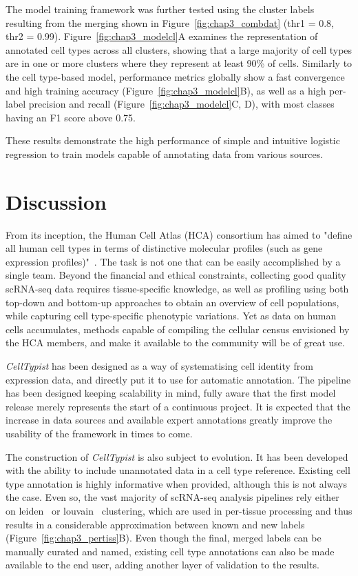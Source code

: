 The model training framework was further tested using the cluster labels resulting from the merging shown in Figure~\ref{fig:chap3_combdat} (thr1 = 0.8, thr2 = 0.99). Figure~\ref{fig:chap3_modelcl}A examines the representation of annotated cell types across all clusters, showing that a large majority of cell types are in one or more clusters where they represent at least 90\% of cells. Similarly to the cell type-based model, performance metrics globally show a fast convergence and high training accuracy (Figure~\ref{fig:chap3_modelcl}B), as well as a high per-label precision and recall (Figure~\ref{fig:chap3_modelcl}C, D), with most classes having an F1 score above 0.75.

These results demonstrate the high performance of simple and intuitive logistic regression to train models capable of annotating data from various sources.



\section{Discussion}
\label{section3.5}
From its inception, the Human Cell Atlas (HCA) consortium has aimed to "define all human cell types in terms of distinctive molecular profiles (such as gene expression profiles)"~\citep{regev_human_2017}. The task is not one that can be easily accomplished by a single team. Beyond the financial and ethical constraints, collecting good quality scRNA-seq data requires tissue-specific knowledge, as well as profiling using both top-down and bottom-up approaches to obtain an overview of cell populations, while capturing cell type-specific phenotypic variations. Yet as data on human cells accumulates, methods capable of compiling the cellular census envisioned by the HCA members, and make it available to the community will be of great use.

\textit{CellTypist} has been designed as a way of systematising cell identity from expression data, and directly put it to use for automatic annotation. The pipeline has been designed keeping scalability in mind, fully aware that the first model release merely represents the start of a continuous project. It is expected that the increase in data sources and available expert annotations greatly improve the usability of the framework in times to come.

The construction of \textit{CellTypist} is also subject to evolution. It has been developed with the ability to include unannotated data in a cell type reference. Existing cell type annotation is highly informative when provided, although this is not always the case. Even so, the vast majority of scRNA-seq analysis pipelines rely either on leiden~\citep{traag_louvain_2019} or louvain~\citep{blondel_fast_2008} clustering, which are used in per-tissue processing and thus results in a considerable approximation between known and new labels (Figure~\ref{fig:chap3_pertiss}B). Even though the final, merged labels can be manually curated and named, existing cell type annotations can also be made available to the end user, adding another layer of validation to the results.

